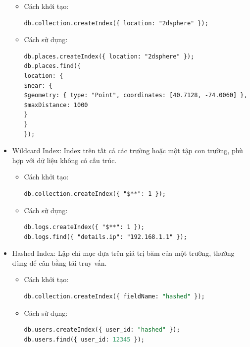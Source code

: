 \begin{itemize}
        \begin{itemize}
            \item Cách khởi tạo:
\begin{lstlisting}[language=inform]
db.collection.createIndex({ location: "2dsphere" });
\end{lstlisting}
            \item Cách sử dụng:
\begin{lstlisting}[language=inform]
db.places.createIndex({ location: "2dsphere" });
db.places.find({
location: {
$near: {
$geometry: { type: "Point", coordinates: [40.7128, -74.0060] },
$maxDistance: 1000
}
}
});
\end{lstlisting}
        \end{itemize}
    \item  Wildcard Index: Index trên tất cả các trường hoặc một tập con trường, phù hợp với dữ liệu không có cấu trúc.
        \begin{itemize}
            \item Cách khởi tạo:
\begin{lstlisting}
db.collection.createIndex({ "$**": 1 });
\end{lstlisting}
            \item Cách sử dụng:
\begin{lstlisting}[language=inform]
db.logs.createIndex({ "$**": 1 });
db.logs.find({ "details.ip": "192.168.1.1" });
\end{lstlisting}
        \end{itemize}
    \item Hashed Index: Lập chỉ mục dựa trên giá trị băm của một trường, thường dùng để cân bằng tải truy vấn.
        \begin{itemize}
            \item Cách khởi tạo:
\begin{lstlisting}[language=SQL]
db.collection.createIndex({ fieldName: "hashed" });
\end{lstlisting}
            \item Cách sử dụng:
\begin{lstlisting}[language=SQL]
db.users.createIndex({ user_id: "hashed" });
db.users.find({ user_id: 12345 });
\end{lstlisting}
        \end{itemize}
\end{itemize}


